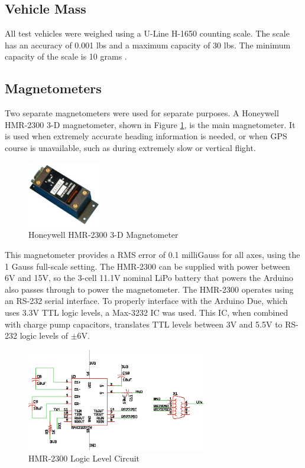 \subsection*{Vehicle Mass}
All test vehicles were weighed using a U-Line H-1650 counting scale. The scale has an accuracy of 0.001 lbs and a maximum capacity of 30 lbs. The minimum capacity of the scale is 10 grams \cite{U-Line}.
\subsection*{Magnetometers}
Two separate magnetometers were used for separate purposes. A Honeywell HMR-2300 3-D magnetometer, shown in Figure \ref{hmr23000Picture}, is the main magnetometer. It is used when extremely accurate heading information is needed, or when GPS course is unavailable, such as during extremely slow or vertical flight.

\begin{figure}[H]

  \centering
    \includegraphics[width=0.3\textwidth]{figures/hmr2300.jpg}
      \caption{Honeywell HMR-2300 3-D Magnetometer } \label{hmr23000Picture}
\end{figure}

This magnetometer provides a RMS error of 0.1 milliGauss for all axes, using the 1 Gauss full-scale setting\cite{hmr2300DataSheet}.
The HMR-2300 can be supplied with power between 6V and 15V, so the 3-cell 11.1V nominal LiPo battery that powers the Arduino also passes through to power the magnetometer. The HMR-2300 operates using an RS-232 serial interface. To properly interface with the Arduino Due, which uses 3.3V TTL logic levels, a Max-3232 IC was used. This IC, when combined with charge pump capacitors, translates TTL levels between 3V and 5.5V to RS-232 logic levels of $\pm6$V.
 \begin{figure}[H]

   \centering
     \includegraphics[width=0.7\textwidth]{figures/magBoard.eps}
        \caption{HMR-2300 Logic Level Circuit} \label{magBoardSchematic}
 \end{figure}
 
